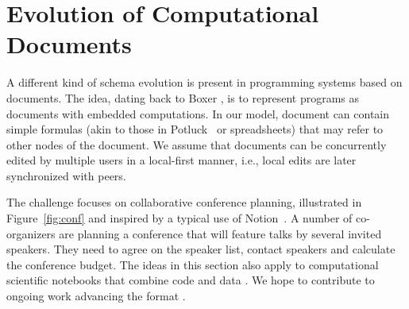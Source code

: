 \documentclass[english,crc]{programming}
\begin{document}

\section{Evolution of Computational Documents}
A different kind of schema evolution is present in programming systems based on documents.
The idea, dating back to Boxer \cite{diSessa86}, is to represent programs as documents
with embedded computations. In our model, document can contain simple formulas (akin to those
in Potluck~\cite{Litt2023} or spreadsheets) that may refer to other nodes of the document.
We assume that documents can be concurrently edited by multiple users in a local-first manner,
i.e., local edits are later synchronized with peers.

The challenge focuses on collaborative conference planning, illustrated in Figure~\ref{fig:conf}
and inspired by a typical use of Notion~\cite{notion}. A number of co-organizers are planning
a conference that will feature talks by several invited speakers. They need to agree on the
speaker list, contact speakers and calculate the conference budget.
%
The ideas in this section also apply to computational scientific notebooks
that combine code and data \cite{Kluyver2016}. We hope to contribute to ongoing
work advancing the format \cite{Nextjournal21,Crichton2021,Heer2023}.
\end{document}
